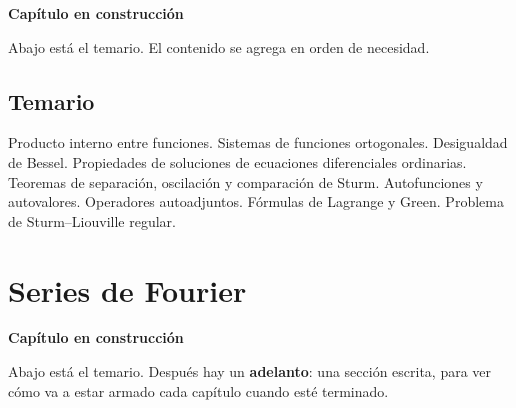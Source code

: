 \documentclass[
  spanish,
  a4paper,
]{scrbook}
\theoremstyle{definition}
\theoremstyle{plain}
\theoremstyle{definition}
\theoremstyle{plain}
\theoremstyle{definition}
\theoremstyle{remark}
\begin{document}
\begin{tcolorbox}[enhanced jigsaw, arc=.35mm, bottomrule=.15mm, breakable, colback=white, colframe=quarto-callout-note-color-frame, left=2mm, leftrule=.75mm, opacityback=0, rightrule=.15mm, toprule=.15mm]
\begin{minipage}[t]{5.5mm}
\textcolor{quarto-callout-note-color}{\faInfo}
\end{minipage}%
\begin{minipage}[t]{\textwidth - 5.5mm}

\vspace{-3mm}\textbf{Capítulo en construcción}\vspace{3mm}

Abajo está el temario. El contenido se agrega en orden de necesidad.

\end{minipage}%
\end{tcolorbox}

\section*{Temario}\label{temario-1}


Producto interno entre funciones. Sistemas de funciones ortogonales.
Desigualdad de Bessel. Propiedades de soluciones de ecuaciones
diferenciales ordinarias. Teoremas de separación, oscilación y
comparación de Sturm. Autofunciones y autovalores. Operadores
autoadjuntos. Fórmulas de Lagrange y Green. Problema de Sturm--Liouville
regular.

\chapter{Series de Fourier}\label{sec-fourier}

\begin{tcolorbox}[enhanced jigsaw, arc=.35mm, bottomrule=.15mm, breakable, colback=white, colframe=quarto-callout-note-color-frame, left=2mm, leftrule=.75mm, opacityback=0, rightrule=.15mm, toprule=.15mm]
\begin{minipage}[t]{5.5mm}
\textcolor{quarto-callout-note-color}{\faInfo}
\end{minipage}%
\begin{minipage}[t]{\textwidth - 5.5mm}

\vspace{-3mm}\textbf{Capítulo en construcción}\vspace{3mm}

Abajo está el temario. Después hay un \textbf{adelanto}: una sección
escrita, para ver cómo va a estar armado cada capítulo cuando esté
terminado.

\end{minipage}%
\end{tcolorbox}
\end{document}

